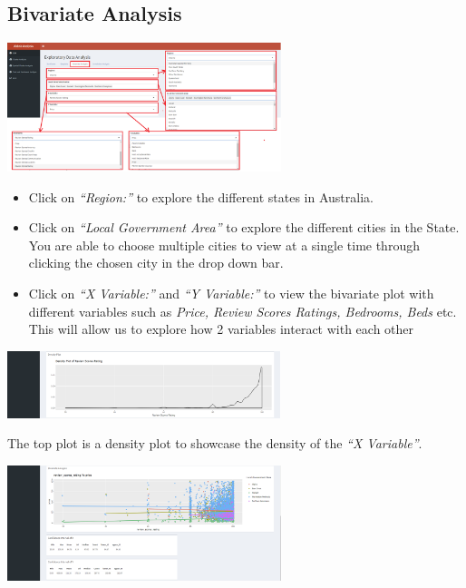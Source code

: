 \documentclass[
]{article}
\providecommand{\tightlist}{%
  \setlength{\itemsep}{0pt}\setlength{\parskip}{0pt}}
\begin{document}
\hypertarget{bivariate-analysis}{%
\subsection{Bivariate Analysis}\label{bivariate-analysis}}

\includegraphics[width=0.6\textwidth,height=\textheight]{images/edabivariate.png}

\begin{itemize}
\tightlist
\item
  Click on \emph{``Region:''} to explore the different states in
  Australia.
\item
  Click on \emph{``Local Government Area''} to explore the different
  cities in the State. You are able to choose multiple cities to view at
  a single time through clicking the chosen city in the drop down bar.
\item
  Click on \emph{``X Variable:''} and \emph{``Y Variable:''} to view the
  bivariate plot with different variables such as \emph{Price, Review
  Scores Ratings, Bedrooms, Beds} etc. This will allow us to explore how
  2 variables interact with each other
\end{itemize}

\includegraphics[width=0.6\textwidth,height=\textheight]{images/edabivariate2.png}

The top plot is a density plot to showcase the density of the \emph{``X
Variable''}.

\includegraphics[width=0.6\textwidth,height=\textheight]{images/edabivariate3.png}
\end{document}
